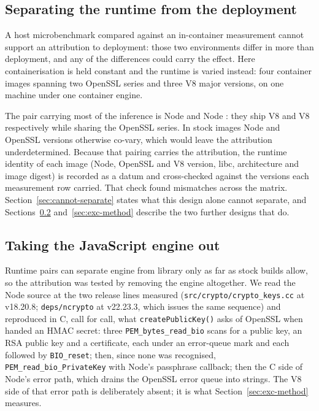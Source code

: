 \documentclass[preprint,12pt,authoryear]{elsarticle}
\begin{document}
\subsection{Separating the runtime from the deployment}\label{sec:matrix-method}

A host microbenchmark compared against an in-container measurement cannot
support an attribution to deployment: those two environments differ in more than
deployment, and any of the differences could carry the effect. Here
containerisation is held constant and the runtime is varied instead:
four container images spanning two OpenSSL series and three V8 major versions,
on one machine under one container engine.

The pair carrying most of the inference is Node \NodeEighteenNodeMajor{} and
Node \NodeTwentyNodeMajor: they ship V8 \NodeEighteenVeight{} and V8
\NodeTwentyVeight{} respectively while sharing the OpenSSL
\NodeEighteenOpensslSeries{} series. In stock images Node and OpenSSL versions
otherwise co-vary, which would leave the attribution underdetermined. Because
that pairing carries the attribution, the runtime identity of each image (Node, OpenSSL and V8 version, libc, architecture and image digest) is
recorded as a datum and cross-checked against the versions each measurement row
carried. That check found \IdentityMismatches{} mismatches across the matrix.
Section~\ref{sec:cannot-separate} states what this design alone cannot
separate, and Sections~\ref{sec:c-method} and~\ref{sec:exc-method} describe the
two further designs that do.

\subsection{Taking the JavaScript engine out}\label{sec:c-method}

Runtime pairs can separate engine from library only as far as stock builds
allow, so the attribution was tested by removing the engine altogether. We read
the Node source at the two release lines measured
(\texttt{src/crypto/crypto\_keys.cc} at v18.20.8; \texttt{deps/ncrypto} at
v22.23.3, which issues the same sequence) and reproduced in C, call for call,
what \texttt{createPublicKey()} asks of OpenSSL when handed an HMAC secret:
three \texttt{PEM\_bytes\_read\_bio} scans for a public key, an RSA public key
and a certificate, each under an error-queue mark and each followed by
\texttt{BIO\_reset}; then, since none was recognised,
\texttt{PEM\_read\_bio\_PrivateKey} with Node's passphrase callback; then the
C side of Node's error path, which drains the OpenSSL error queue into
strings. The V8 side of that error path is deliberately absent; it is what
Section~\ref{sec:exc-method} measures.
\end{document}
